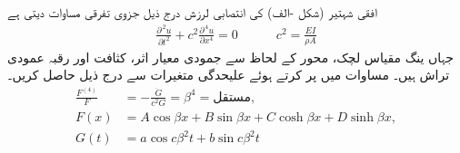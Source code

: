 \quad 
افقی شہتیر (شکل -الف) کی انتصابی  لرزش درج ذیل جزوی تفرقی مساوات دیتی ہے
\begin{align}\label{مساوات_جزوی_شہتیر_الف}
\frac{\partial^{\,2}u}{\partial t^2}+c^2\frac{\partial^{\,4}u}{\partial x^4}=0\quad \quad \quad c^2=\frac{EI}{\rho A}
\end{align}
جہاں  ینگ مقیاس لچک، محور  کے لحاظ سے   جمودی معیار اثر،  کثافت اور  رقبہ عمودی تراش ہیں۔ مساوات  میں  پر کرتے ہوئے علیحدگی متغیرات سے درج ذیل حاصل کریں۔
\begin{align*}
\frac{F^{(4)}}{F}&=-\frac{\ddot{G}}{c^2G}=\beta^4=\text{مستقل},\\
F(x)&=A\cos \beta x+B\sin \beta x+C\cosh \beta x+D\sinh \beta x,\\
G(t)&=a\cos c\beta^2t+b\sin c\beta^2 t
\end{align*} 
%
